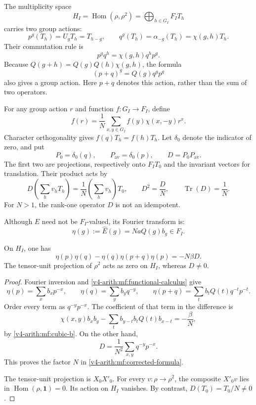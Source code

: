 The multiplicity space
\[
 H_I=\operatorname{Hom}(\rho,\rho^2)
       =\bigoplus_{h\in G_I}F_IT_h
\]
carries two group actions:
\begin{equation}\label{v4-arith:mf:heisenberg}
 p^g(T_h)=U_gT_h=T_{h-g},\qquad
 q^g(T_h)=\alpha_{-g}(T_h)=\chi(g,h)T_h.
\end{equation}
Their commutation rule is
\[
 p^gq^h=\chi(g,h)q^hp^g.
\]
Because \(Q(g+h)=Q(g)Q(h)\chi(g,h)\), the formula
\[
 (p+q)^g=Q(g)q^gp^g
\]
also gives a group action. Here \(p+q\) denotes this action,
rather than the sum of two operators.

For any group action \(r\) and function \(f:G_I\to F_I\), define
\begin{equation}\label{v4-arith:mf:functional-calculus}
 f(r)=\frac1N\sum_{x,y\in G_I}f(y)\chi(x,-y)r^x.
\end{equation}
Character orthogonality gives \(f(q)T_h=f(h)T_h\).
Let \(\delta_0\) denote the indicator of zero, and put
\[
 P_0=\delta_0(q),\qquad
 P_{\mathrm{av}}=\delta_0(p),\qquad D=P_0P_{\mathrm{av}}.
\]
The first two are projections, respectively onto \(F_IT_0\)
and the invariant vectors for translation.
Their product acts by
\begin{equation}\label{v4-arith:mf:D}
 D\!\left(\sum_hv_hT_h\right)
       =\frac1N\left(\sum_hv_h\right)T_0,\qquad
 D^2=\frac DN,\qquad \operatorname{Tr}(D)=\frac1N.
\end{equation}
For \(N>1\), the rank-one operator \(D\) is not an idempotent.

Although \(E\) need not be \(F_I\)-valued, its Fourier transform is:
\[
 \eta(g):=\widehat E(g)=NaQ(g)b_g\in F_I.
\]

\begin{theorem}\label{v4-arith:mf:corrected-identity}
On \(H_I\), one has
\begin{equation}\label{v4-arith:mf:corrected-formula}
 \eta(p)\eta(q)-\eta(q)\eta(p+q)\eta(p)=-N\beta D.
\end{equation}
The tensor-unit projection of \(\rho^2\) acts as zero on \(H_I\),
whereas \(D\ne0\).
\end{theorem}

\begin{proof}
Fourier inversion and \eqref{v4-arith:mf:functional-calculus} give
\[
 \eta(p)=\sum_xb_xp^{-x},\qquad
 \eta(q)=\sum_yb_yq^{-y},\qquad
 \eta(p+q)=\sum_tb_tQ(t)q^{-t}p^{-t}.
\]
Order every term as \(q^{-y}p^{-x}\).
The coefficient of that term in the difference is
\[
 \chi(x,y)b_xb_y
       -\sum_tb_{y-t}b_tQ(t)b_{x-t}
       =-\frac{\beta}{N},
\]
by \eqref{v4-arith:mf:cubic-b}.
On the other hand,
\[
 D=\frac1{N^2}\sum_{x,y}q^{-y}p^{-x}.
\]
This proves the factor \(N\) in
\eqref{v4-arith:mf:corrected-formula}.

The tensor-unit projection is \(X_0X'_0\).
For every \(v:\rho\to\rho^2\),
the composite \(X'_0v\) lies in
\(\operatorname{Hom}(\rho,\mathbf1)=0\).
Its action on \(H_I\) vanishes.
By contrast, \(D(T_0)=T_0/N\ne0\).
\end{proof}

